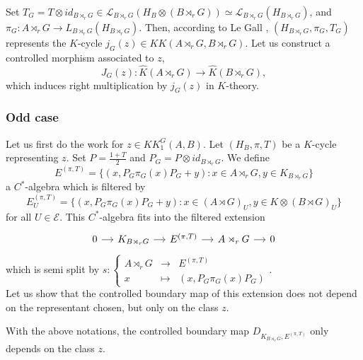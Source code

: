 Set $T_G= T\otimes id_{B\rtimes_r G}\in \mathcal L_{B\rtimes_r G}(H_B\otimes (B\rtimes_r G))\simeq \mathcal L_{B\rtimes_r G}(H_{B\rtimes_r G})$, and $\pi_G: A\rtimes_r G \rightarrow L_{B\rtimes_r G}(H_{B\rtimes_r G})$. Then, according to Le Gall \cite{LeGall}, $(H_{B\rtimes_r G}, \pi_G, T_G)$ represents the $K$-cycle $j_G(z)\in KK(A\rtimes_r G,B\rtimes_r G)$. Let us construct a controlled morphism associated to $z$,
\[J_G(z) : \hat K(A\rtimes_r G)\rightarrow \hat K(B\rtimes_r G), \]
which induces right multiplication by $j_G(z)$ in $K$-theory.

\subsubsection{Odd case}

Let us first do the work for $z\in KK_1^G(A,B)$. Let $(H_B,\pi,T)$ be a $K$-cycle representing $z$. Set $P=\frac{1+T}{2}$ and $P_G=P\otimes id_{B\rtimes_r G}$. We define
\[E^{(\pi,T)}=\{(x,P_G\pi_G(x)P_G + y) : x\in A\rtimes_r G, y\in K_{B\rtimes_r G}\}\]
a $C^*$-algebra which is filtered by
\[E_U^{(\pi,T)}=\{(x,P_G\pi_G(x)P_G + y) : x\in (A\rtimes G)_U, y\in K\otimes (B\rtimes G)_U\}\]
for all $U\in\mathcal E$. This $C^*$-algebra fits into the filtered extension
\[\begin{tikzcd}[column sep = small]
0\arrow{r} & K_{B\rtimes_r G}\arrow{r} & E^{(\pi,T)} \arrow{r} & A\rtimes_r G \arrow{r}& 0
\end{tikzcd}\]
which is semi split by  $s :\left\{\begin{array}{lll}A\rtimes_r G & \rightarrow & E^{(\pi,T)} \\ x & \mapsto & (x, P_G \pi_G(x)P_G)\end{array}\right.$.\\

Let us show that the controlled boundary map of this extension does not depend on the representant chosen, but only on the class $z$.

\begin{lem} With the above notations, the controlled boundary map $D_{K_{B\rtimes_r G},E^{(\pi,T)}}$ only depends on the class $z$.
\end{lem}

